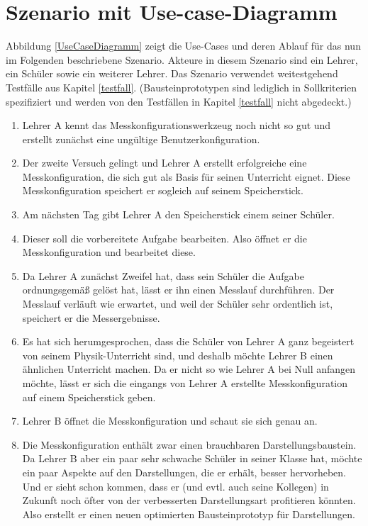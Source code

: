 \documentclass[parskip=full]{scrartcl}
\begin{document}
\clearpage
\section{Szenario mit Use-case-Diagramm}\label{scenario}

Abbildung \ref{UseCaseDiagramm} zeigt die Use-Cases und deren Ablauf für das nun im Folgenden beschriebene Szenario. Akteure in diesem Szenario sind ein Lehrer, ein Schüler sowie ein weiterer Lehrer. Das Szenario verwendet weitestgehend Testfälle aus Kapitel \ref{testfall}. (Bausteinprototypen sind lediglich in Sollkriterien spezifiziert und werden von den Testfällen in Kapitel \ref{testfall} nicht abgedeckt.)

\begin{enumerate}
	\item Lehrer A kennt das Messkonfigurationswerkzeug noch nicht so gut und erstellt zunächst eine ungültige \gls{Benutzerkonfiguration}. 
	
	\item Der zweite Versuch gelingt und Lehrer A erstellt erfolgreiche eine Messkonfiguration, die sich gut als Basis für seinen Unterricht eignet. Diese Messkonfiguration speichert er sogleich auf seinem Speicherstick.
	
	\item Am nächsten Tag gibt Lehrer A den Speicherstick einem seiner Schüler. 
	
	\item Dieser soll die vorbereitete Aufgabe bearbeiten. Also öffnet er die Messkonfiguration und bearbeitet diese.
	
	\item Da Lehrer A zunächst Zweifel hat, dass sein Schüler die Aufgabe ordnungsgemäß gelöst hat, lässt er ihn einen Messlauf durchführen. Der Messlauf verläuft wie erwartet, und weil der Schüler sehr ordentlich ist, speichert er die Messergebnisse.
	
	\item Es hat sich herumgesprochen, dass die Schüler von Lehrer A ganz begeistert von seinem Physik-Unterricht sind, und deshalb möchte Lehrer B einen ähnlichen Unterricht machen. Da er nicht so wie Lehrer A bei Null anfangen möchte, lässt er sich die eingangs von Lehrer A erstellte Messkonfiguration auf einem Speicherstick geben. 
	
	\item Lehrer B öffnet die Messkonfiguration und schaut sie sich genau an.
	
	\item Die Messkonfiguration enthält zwar einen brauchbaren Darstellungsbaustein. Da Lehrer B aber ein paar sehr schwache Schüler in seiner Klasse hat, möchte ein paar Aspekte auf den Darstellungen, die er erhält, besser hervorheben. Und er sieht schon kommen, dass er (und evtl. auch seine Kollegen) in Zukunft noch öfter von der verbesserten Darstellungsart profitieren könnten. Also erstellt er einen neuen optimierten Bausteinprototyp für Darstellungen.
	

\end{enumerate}
\end{document}
